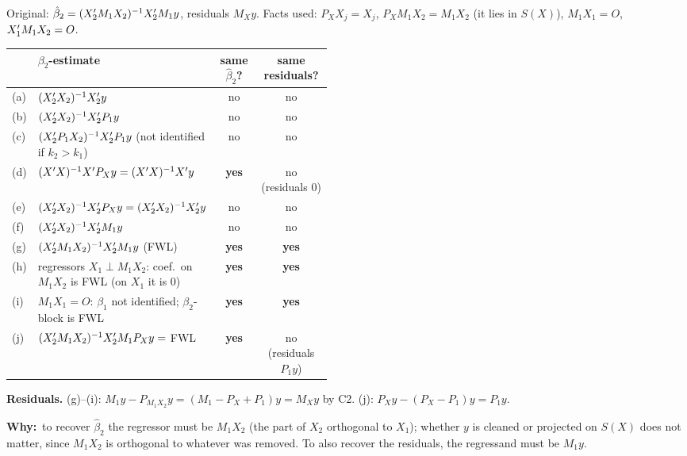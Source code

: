 \documentclass[11pt]{article}
\newcommand{\step}[1]{\par\smallskip\noindent\textbf{\textcolor{qnavy}{#1}}\quad\ignorespaces}
\newcommand{\Why}{\textbf{\textcolor{whyline}{Why:}}\ }
\begin{document}
\begin{solbox}
Original: $\hat\beta_{2}=(X_{2}^{\prime} M_{1}X_{2})^{-1}X_{2}^{\prime} M_{1}y$, residuals $M_{X}y$. Facts used:
$P_{X}X_{j}=X_{j}$, $P_{X}M_{1}X_{2}=M_{1}X_{2}$ (it lies in $S(X)$), $M_{1}X_{1}=O$, $X_{1}^{\prime} M_{1}X_{2}=O$.
\begin{center}
\renewcommand{\arraystretch}{1.15}\small
\begin{tabular}{l p{0.47\linewidth} c c}
\toprule
 & $\beta_{2}$-estimate & same $\hat\beta_{2}$? & same residuals? \\
\midrule
(a) & $(X_{2}^{\prime} X_{2})^{-1}X_{2}^{\prime} y$ & no & no \\
(b) & $(X_{2}^{\prime} X_{2})^{-1}X_{2}^{\prime} P_{1}y$ & no & no \\
(c) & $(X_{2}^{\prime} P_{1}X_{2})^{-1}X_{2}^{\prime} P_{1}y$ (not identified if $k_{2}>k_{1}$) & no & no \\
(d) & $(X^{\prime} X)^{-1}X^{\prime} P_{X}y=(X^{\prime} X)^{-1}X^{\prime} y$ & \textbf{yes} & no (residuals $0$) \\
(e) & $(X_{2}^{\prime} X_{2})^{-1}X_{2}^{\prime} P_{X}y=(X_{2}^{\prime} X_{2})^{-1}X_{2}^{\prime} y$ & no & no \\
(f) & $(X_{2}^{\prime} X_{2})^{-1}X_{2}^{\prime} M_{1}y$ & no & no \\
(g) & $(X_{2}^{\prime} M_{1}X_{2})^{-1}X_{2}^{\prime} M_{1}y$ (FWL) & \textbf{yes} & \textbf{yes} \\
(h) & regressors $X_{1}\perp M_{1}X_{2}$: coef.\ on $M_{1}X_{2}$ is FWL (on $X_{1}$ it is $0$) & \textbf{yes} & \textbf{yes} \\
(i) & $M_{1}X_{1}=O$: $\beta_{1}$ not identified; $\beta_{2}$-block is FWL & \textbf{yes} & \textbf{yes} \\
(j) & $(X_{2}^{\prime} M_{1}X_{2})^{-1}X_{2}^{\prime} M_{1}P_{X}y=$ FWL & \textbf{yes} & no (residuals $P_{1}y$) \\
\bottomrule
\end{tabular}
\end{center}
\step{Residuals.} (g)--(i): $M_{1}y-P_{M_{1}X_{2}}y=(M_{1}-P_{X}+P_{1})y=M_{X}y$ by C2. (j): $P_{X}y-(P_{X}-P_{1})y=P_{1}y$.
\begin{why}\Why to recover $\hat\beta_{2}$ the regressor must be $M_{1}X_{2}$ (the part of $X_{2}$ orthogonal to $X_{1}$);
whether $y$ is cleaned or projected on $S(X)$ does not matter, since $M_{1}X_{2}$ is orthogonal to whatever was removed.
To also recover the residuals, the regressand must be $M_{1}y$.\end{why}
\end{solbox}

\end{document}
